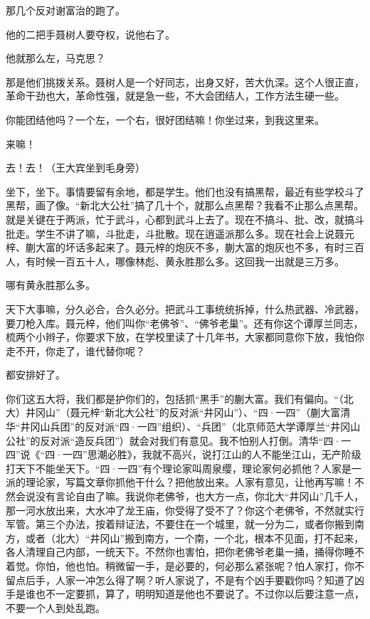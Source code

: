 那几个反对谢富治的跑了。

他的二把手聂树人要夺权，说他右了。

他就那么左，马克思？

那是他们挑拨关系。聂树人是一个好同志，出身又好，苦大仇深。这个人很正直，革命干劲也大，革命性强，就是急一些，不大会团结人，工作方法生硬一些。

你能团结他吗？一个左，一个右，很好团结嘛！你坐过来，到我这里来。

来嘛！

去！去！（王大宾坐到毛身旁）

坐下，坐下。事情要留有余地，都是学生。他们也没有搞黑帮，最近有些学校斗了黑帮，画了像。“新北大公社”搞了几十个，就那么点黑帮？我看不止那么点黑帮。就是关键在于两派，忙于武斗，心都到武斗上去了。现在不搞斗、批、改，就搞斗批走。学生不讲了嘛，斗批走，斗批散。现在逍遥派那么多。现在社会上说聂元梓、蒯大富的坏话多起来了。聂元梓的炮灰不多，蒯大富的炮灰也不多，有时三百人，有时候一百五十人，哪像林彪、黄永胜那么多。这回我一出就是三万多。

哪有黄永胜那么多。

天下大事嘛，分久必合，合久必分。把武斗工事统统拆掉，什么热武器、冷武器，要刀枪入库。聂元梓，他们叫你“老佛爷”、“佛爷老巢”。还有你这个谭厚兰同志，梳两个小辫子，你要求下放，在学校里读了十几年书，大家都同意你下放，我怕你走不开，你走了，谁代替你呢？

都安排好了。

你们这五大将，我们都是护你们的，包括抓“黑手”的蒯大富。我们有偏向。“（北大）井冈山”（聂元梓“新北大公社”的反对派“井冈山”）、“四·一四”（蒯大富清华“井冈山兵团”的反对派“四·一四”组织）、“兵团”（北京师范大学谭厚兰“井冈山公社”的反对派“造反兵团”）就会对我们有意见。我不怕别人打倒。清华“四·一四”说《“四·一四”思潮必胜》，我就不高兴，说打江山的人不能坐江山，无产阶级打天下不能坐天下。“四·一四”有个理论家叫周泉缨，理论家何必抓他？人家是一派的理论家，写篇文章你抓他干什么？把他放出来。人家有意见，让他再写嘛！不然会说没有言论自由了嘛。我说你老佛爷，也大方一点，你北大“井冈山”几千人，那一河水放出来，大水冲了龙王庙，你受得了受不了？你这个老佛爷，不然就实行军管。第三个办法，按着辩证法，不要住在一个城里，就一分为二，或者你搬到南方，或者（北大）“井冈山”搬到南方，一个南，一个北，根本不见面，打不起来，各人清理自己内部，一统天下。不然你也害怕，把你老佛爷老巢一捅，捅得你睡不着觉。你怕，他也怕。稍微留一手，是必要的，何必那么紧张呢？怕人家打，你不留点后手，人家一冲怎么得了啊？听人家说了，不是有个凶手要戳你吗？知道了凶手是谁也不一定要抓，算了，明明知道是他也不要说了。不过你以后要注意一点，不要一个人到处乱跑。

